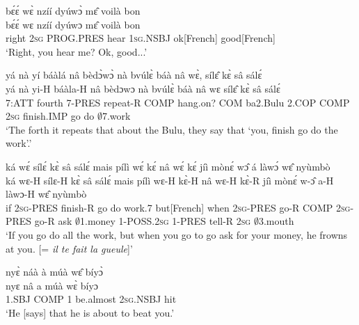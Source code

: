 \begin{exe} 
\exC\label{107}
  \glll  bɛ́ɛ́ wɛ̀ nzíí dyúwɔ̀ mɛ̂ voilà bon \\
        bɛ́ɛ́ wɛ nzíí dyúwɔ mɛ̂ voilà bon \\
        right 2\textsc{sg} PROG.PRES hear 1\textsc{sg}.NSBJ ok[French] good[French]   \\
    \trans `Right, you hear me? Ok, good...'
\end{exe}

\begin{exe} 
\exC\label{108}
  \glll  yá nà yí báàlá nâ bèdɔ̀wɔ̀ nà bvúlɛ̀ báà nâ wɛ̀, sílɛ̂ kɛ̀ sâ sálɛ́ \\
        yá nà yi-H báàla-H nâ bèdɔwɔ nà bvúlɛ̀ báà nâ wɛ sílɛ̂ kɛ̀ sâ sálɛ́ \\
         7:ATT fourth 7-PRES repeat-R COMP hang.on? COM ba2.Bulu 2.COP COMP 2\textsc{sg} finish.IMP go do $\emptyset$7.work  \\
    \trans `The forth it repeats that about the Bulu, they say that `you, finish go do the work'.'
\end{exe}


\begin{exe} 
\exC\label{109}
  \glll ká wɛ́ sílɛ́ kɛ̀ sâ sálɛ́ mais pílì wɛ́ kɛ́ nâ  wɛ́ kɛ́ jíì mònɛ́ wɔ̂ á làwɔ́ wɛ̂ nyùmbò \\
        ká wɛ-H sílɛ-H kɛ̀ sâ sálɛ́ mais pílì wɛ-H kɛ̀-H nâ wɛ-H kɛ̀-R jíì mònɛ́ w-ɔ̂ a-H làwɔ-H wɛ̂ nyùmbò\\
         if 2\textsc{sg}-PRES finish-R go do work.7 but[French] when 2\textsc{sg}-PRES go-R COMP 2\textsc{sg}-PRES go-R ask $\emptyset$1.money 1-POSS.2\textsc{sg} 1-PRES tell-R 2\textsc{sg} $\emptyset$3.mouth   \\
    \trans `If you go do all the work, but when you go to go ask for your money, he frowns at you. [= {\itshape il te fait la gueule}]'
\end{exe}

\begin{exe} 
\exC\label{110}
  \glll  nyɛ̀ náà à múà wɛ̂ bíyɔ̀ \\
        nyɛ nâ a múà wɛ̀ bíyɔ \\
           1.SBJ COMP 1 be.almost 2\textsc{sg}.NSBJ hit \\
    \trans `He [says] that he is about to beat you.'
\end{exe}


